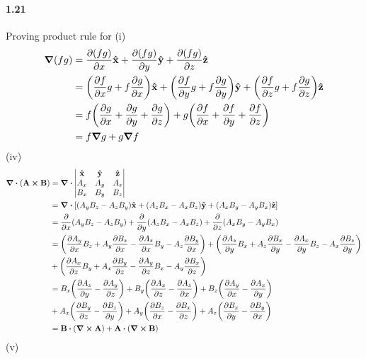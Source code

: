 \documentclass[../main.tex]{subfiles}
\begin{document}
\paragraph{1.21}
Proving product rule for (i)
\begin{align*}
    \grad(fg) &= \pdv{(fg)}{x} \vu{x} + \pdv{(fg)}{y} \vu{y} + \pdv{(fg)}{z} \vu{z} \\
    &= \quantity(\pdv{f}{x} g + f \pdv{g}{x}) \vu{x} + \quantity(\pdv{f}{y} g + f \pdv{g}{y}) \vu{y}
        + \quantity(\pdv{f}{z} g + f \pdv{g}{z})  \vu{z}\\
    &= f\quantity(\pdv{g}{x} + \pdv{g}{y} + \pdv{g}{z})
        + g\quantity(\pdv{f}{x} + \pdv{f}{y} + \pdv{f}{z}) \\
    &= f\grad{g} + g\grad{f}
\end{align*}
(iv)
\begin{align*}
    \div(\vb{A} \cp \vb{B}) &= \div \begin{vmatrix}
        \vu{x} & \vu{y} & \vu{z} \\
        A_x & A_y & A_z \\
        B_x & B_y & B_z
    \end{vmatrix} \\
    &= \div [(A_y B_z - A_z B_y) \vu{x} + (A_z B_x - A_x B_z) \vu{y}
        + (A_x B_y - A_y B_x) \vu{z}] \\
    &= \pdv{x}(A_y B_z - A_z B_y) + \pdv{y}(A_z B_x - A_x B_z) + \pdv{z}(A_x B_y - A_y B_x) \\
    &= \qt(\pdv{A_y}{x} B_z + A_y \pdv{B_z}{x} - \pdv{A_z}{x} B_y - A_z \pdv{B_y}{x}) 
    + \qt(\pdv{A_z}{y} B_x + A_z \pdv{B_x}{y} - \pdv{A_x}{y} B_z - A_x \pdv{B_z}{y}) \\
    &+ \qt(\pdv{A_x}{z} B_y + A_x \pdv{B_y}{z} - \pdv{A_y}{z} B_x - A_y \pdv{B_x}{z}) \\
    &= B_x \qt(\pdv{A_z}{y} - \pdv{A_y}{z}) + B_y \qt(\pdv{A_x}{z} - \pdv{A_z}{x})
        + B_z \qt(\pdv{A_y}{x} - \pdv{A_x}{y}) \\
    &+ A_x \qt(\pdv{B_y}{z} - \pdv{B_z}{y}) + A_y \qt(\pdv{B_z}{x} - \pdv{B_x}{z})
        + A_z \qt(\pdv{B_x}{y} - \pdv{B_y}{x}) \\
    &= \vb{B} \vdot (\curl{\vb{A}}) + \vb{A} \vdot (\curl{\vb{B}})
\end{align*}
(v)
\end{document}
